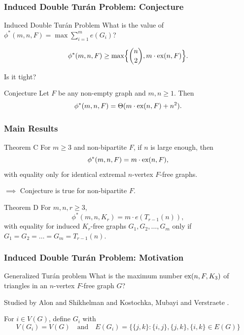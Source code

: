 \documentclass{beamer}
\newcommand*{\ex}{\textnormal{ex}}
\begin{document}
\begin{frame}

  \frametitle{Induced Double Turán Problem: Conjecture}

  \begin{block}{Induced Double Turán Problem}
    What is the value of $\phi^*(m, n, F) = \max \sum_{i = 1}^m e(G_i)$?
  \end{block}

  \[
    \phi^*(m, n, F) \geq \max\Bigl\{\binom{n}{2},m \cdot \ex(n,F)\Bigr\}.
  \]

  \pause

  Is it tight?

  \pause

  \begin{block}{Conjecture}
    Let $F$ be any non-empty graph and $m, n \geq 1$. Then
    \[ 
      \phi^*(m,n,F) = \Theta(m \cdot \ex(n,F) + n^2).
    \]
  \end{block}
\end{frame}

\begin{frame}
  \frametitle{Main Results}


  \begin{block}{Theorem C}
    For $m \geq 3$ and non-bipartite $F$, if $n$ is large enough, then
    \[
      \phi^*(m, n, F) = m \cdot \ex(n, F),
    \]
    with equality only for identical extremal $n$-vertex $F$-free graphs.
  \end{block}

  \pause

  $\implies$ Conjecture is true for non-bipartite $F$.

  \vspace{0.1cm}

  \pause

  \begin{block}{Theorem D}
    For $m, n, r \geq 3$,
    \[
      \phi^*(m,n,K_{r}) = m \cdot e(T_{r - 1}(n)),
    \]
    with equality for induced $K_{r}$-free graphs $G_1, G_2, \dots, G_m$ only if $G_1 = G_2 = \dots = G_m = T_{r - 1}(n)$.  
  \end{block}
\end{frame}

\begin{frame}
  \frametitle{Induced Double Turán Problem: Motivation}

  \begin{block}{Generalized Turán problem}
    What is the maximum number $\ex(n, F, K_3)$ of triangles in an $n$-vertex $F$-free graph $G$?
  \end{block}

  Studied by Alon and Shikhelman \cite{AlonShikhelman2016} and Kostochka, Mubayi and Verstraete \cite{KostochkaMubayiV2015,MubayiMukherjee2023,MubayiV2016}.

  \pause 

  \vspace{0.7cm}

  For $i \in V(G)$, define $G_i$ with
  \[
    V(G_i) = V(G) \quad \text{and} \quad E(G_i) = \{\{j, k\} : \{i, j\}, \{j, k\}, \{i, k\} \in E(G)\}
  \]
\end{frame}
\end{document}
